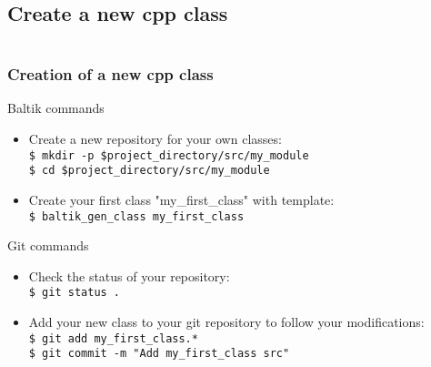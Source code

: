 \documentclass[10pt, hyperref={unicode=true,pdfusetitle, bookmarks=true,bookmarksnumbered=false,bookmarksopen=false, breaklinks=false,pdfborder={0 0 1},backref=true,colorlinks=true,linkcolor=darkblue,pageanchor, urlcolor=darkblue}]{beamer}
\begin{document}
\subsection{{\bf{Create a new cpp class}}}
\begin{frame}
\begin{columns}[c] 
\tableofcontents[sections={1-4},currentsection, currentsubsection]
\tableofcontents[sections={5-8},currentsection, currentsubsection]
\end{columns}
\end{frame}
\begin{frame}
\frametitle{Creation of a new cpp class}

\begin{block}{Baltik commands}
\begin{itemize}
\item Create a new repository for your own classes:\\
\texttt{\$ mkdir -p \$project\_directory/src/my\_module}\\
\texttt{\$ cd \$project\_directory/src/my\_module}\\
\item Create your first class "my\_first\_class" with template:\\
\texttt{\$ baltik\_gen\_class my\_first\_class}\\
\end{itemize}
\end{block}

\begin{alertblock}{Git commands}
\begin{itemize}
\item Check the status of your repository:\\
\texttt{\$ git status .}\\

\item Add your new class to your git repository to follow your modifications:\\
\texttt{\$ git add my\_first\_class.*}\\
\texttt{\$ git commit -m "Add my\_first\_class src"}\\
\end{itemize}
\end{alertblock}

\end{frame}
\end{document}

